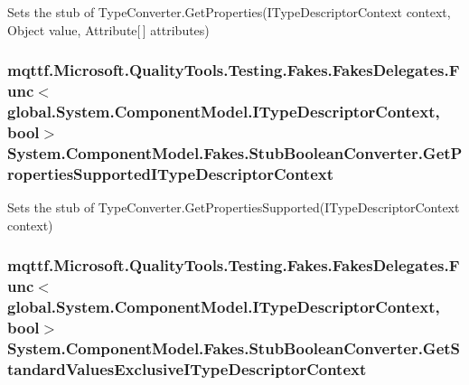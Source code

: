 Sets the stub of Type\-Converter.\-Get\-Properties(\-I\-Type\-Descriptor\-Context context, Object value, Attribute\mbox{[}$\,$\mbox{]} attributes)

\hypertarget{class_system_1_1_component_model_1_1_fakes_1_1_stub_boolean_converter_a4e8cbeedb23fc101b59a3b1a1358a33f}{
\subsubsection[{Get\-Properties\-Supported\-I\-Type\-Descriptor\-Context}]{\setlength{\rightskip}{0pt plus 5cm}mqttf.\-Microsoft.\-Quality\-Tools.\-Testing.\-Fakes.\-Fakes\-Delegates.\-Func$<$global.\-System.\-Component\-Model.\-I\-Type\-Descriptor\-Context, bool$>$ System.\-Component\-Model.\-Fakes.\-Stub\-Boolean\-Converter.\-Get\-Properties\-Supported\-I\-Type\-Descriptor\-Context}}\label{class_system_1_1_component_model_1_1_fakes_1_1_stub_boolean_converter_a4e8cbeedb23fc101b59a3b1a1358a33f}


Sets the stub of Type\-Converter.\-Get\-Properties\-Supported(\-I\-Type\-Descriptor\-Context context)

\hypertarget{class_system_1_1_component_model_1_1_fakes_1_1_stub_boolean_converter_a86efb9280b2856265fc30b3306e4020e}{
\subsubsection[{Get\-Standard\-Values\-Exclusive\-I\-Type\-Descriptor\-Context}]{\setlength{\rightskip}{0pt plus 5cm}mqttf.\-Microsoft.\-Quality\-Tools.\-Testing.\-Fakes.\-Fakes\-Delegates.\-Func$<$global.\-System.\-Component\-Model.\-I\-Type\-Descriptor\-Context, bool$>$ System.\-Component\-Model.\-Fakes.\-Stub\-Boolean\-Converter.\-Get\-Standard\-Values\-Exclusive\-I\-Type\-Descriptor\-Context}}\label{class_system_1_1_component_model_1_1_fakes_1_1_stub_boolean_converter_a86efb9280b2856265fc30b3306e4020e}


